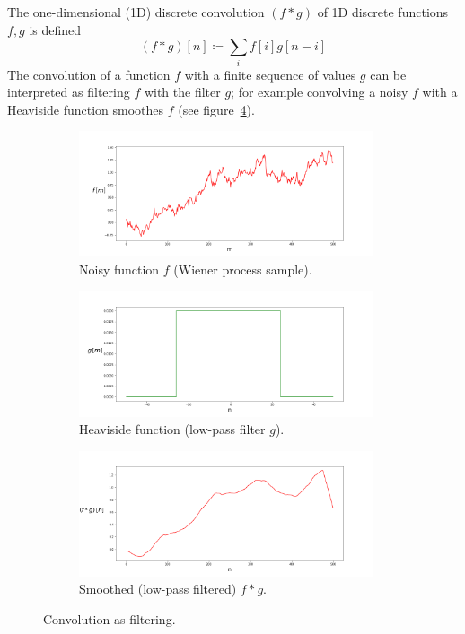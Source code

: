 The one-dimensional (1D) discrete convolution \((f*g)\) of 1D discrete functions \(f,g\) is defined
\begin{equation}
    (f*g)[n]\coloneqq \sum _{i} f[i]g[n-i]
    \label{eqn:1dconv}
\end{equation}
The convolution of a function \(f\) with a finite sequence of values \(g\) can be interpreted as filtering \(f\) with the filter \(g\); for example convolving a noisy \(f\) with a Heaviside function smoothes \(f\) (see figure~\ref{fig:convfiltering}).
\begin{figure}[!htbp]
    \centering
    \begin{subfigure}[b]{.49\textwidth}
        \centering
        \includegraphics[width=0.95\textwidth]{figures/neural_networks/unsmoothed.png}
        \caption{Noisy function \(f\) (Wiener process sample).}\label{fig:convnoisy}
    \end{subfigure}

    \begin{subfigure}[b]{.49\textwidth}
        \centering
        \includegraphics[width=0.95\textwidth]{figures/neural_networks/kernel.png}
        \caption{Heaviside function (low-pass filter \(g\)).}\label{fig:convfilter}
    \end{subfigure}
    \begin{subfigure}[b]{.49\textwidth}
        \centering
        \includegraphics[width=0.95\textwidth]{figures/neural_networks/smoothed.png}
        \caption{Smoothed (low-pass filtered) \(f * g\).}\label{fig:convsmooth}
    \end{subfigure}
    \caption{Convolution as filtering.}\label{fig:convfiltering}
\end{figure}
